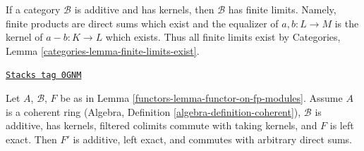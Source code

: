If a category $\mathcal{B}$ is additive and has kernels,
then $\mathcal{B}$ has finite limits. Namely, finite products
are direct sums which exist and the equalizer of $a, b : L \to M$
is the kernel of $a - b : K \to L$ which exists. Thus all finite
limits exist by Categories, Lemma \ref{categories-lemma-finite-limits-exist}.

\begin{lemma}
\label{functors-lemma-functor-on-fp-modules-left-exact}
\href{https://stacks.math.columbia.edu/tag/0GNM}{\texttt{Stacks tag 0GNM}}

Let $A$, $\mathcal{B}$, $F$ be as in Lemma \ref{functors-lemma-functor-on-fp-modules}.
Assume $A$ is a coherent ring (Algebra, Definition
\ref{algebra-definition-coherent}), $\mathcal{B}$ is additive, has kernels,
filtered colimits commute with taking kernels, and $F$ is left exact. Then
$F'$ is additive, left exact, and commutes with arbitrary direct sums.
\end{lemma}

